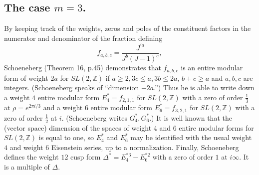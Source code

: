 \documentclass{article}
\begin{document}
\subsection[]{The case $m=3$.}
By keeping
track
of the weights, zeros and poles of the
constituent factors in the 
numerator and denominator of the
fraction defining
$$ f_{a,b,c} = 
\frac{J^{'a}}
{J^b (J - 1)^c},
$$
Schoeneberg \cite{schoeneberg1974} 
(Theorem 16, p.45)
demonstrates  that $f_{a,b,c}$
is an entire modular form of weight $2a$
for $SL(2,\mathbb{Z})$
 if $a \geq 2, 3c  \leq a, 3b \leq 2a$,  
 $b+c \geq a$ and $a, b, c$ are integers.
(Schoeneberg speaks of ``dimension $-2a$.'')
Thus he is able to 
write down a weight $4$ entire modular form
$E^*_4 = f_{2,1,1}$
for $SL(2,\mathbb{Z})$ with a zero
of order $\frac 13$ at $\rho = e^{2 \pi i/3}$
and a weight $6$ 
entire modular form 
$E^*_6 = f_{3,2,1}$
for $SL(2,\mathbb{Z})$
with a zero of order $\frac 12$
at $i$.
(Schoeneberg writes $G^*_4, G^*_6$.)
It is well known that the 
(vector space) dimension of the
spaces of weight $4$ and $6$ entire
modular forms for $SL(2,\mathbb{Z})$
is equal to one,
so $E^*_4$ and  $E^*_6$ 
may be identified
with the usual weight $4$ 
and weight $6$ 
Eisenstein series,
up to a  normalization. 
Finally, Schoeneberg defines
the weight $12$ cusp form
$\Delta^* = E_4^{*3} - E_6^{*2}$
with a zero of order $1$ at $i \infty$. 
It is a multiple of $\Delta$.
\end{document}
